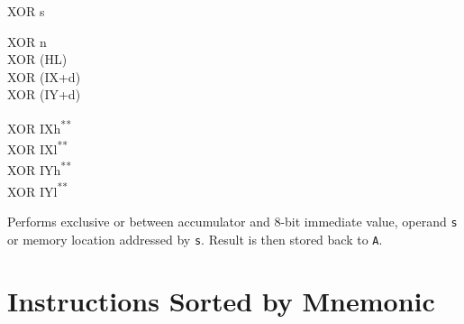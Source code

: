 \documentclass[12pt,twoside,openright,a4paper]{book}
\newcommand{\UNDOC}{\textnormal{\textsuperscript{**}}}
\begin{document}
\begin{basedescript}{
	\desclabelstyle{\multilinelabel}
	\desclabelwidth{3cm}}
\begin{detailitem}{XOR s}
\begin{DetailVariants}
			\columnbreak
			XOR n\\
			XOR (HL)\\
			XOR (IX+d)\\
			XOR (IY+d)

			\columnbreak
			XOR IXh\UNDOC\\
			XOR IXl\UNDOC\\
			XOR IYh\UNDOC\\
			XOR IYl\UNDOC
		\end{DetailVariants}

		Performs exclusive or between accumulator and 8-bit immediate value, operand {\tt s} or memory location addressed by {\tt s}. Result is then stored back to {\tt A}.

		\begin{DetailEffects}[p]
		\end{DetailEffects}
						
		\begin{DetailTiming}
		\end{DetailTiming}

	\end{detailitem}

\end{basedescript}



\appendix



\chapter{Instructions Sorted by Mnemonic}

\end{document}
